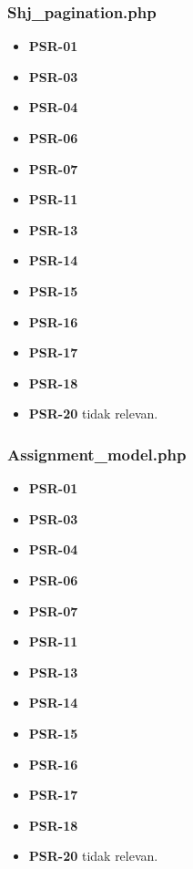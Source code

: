 \subsubsection{Shj\_pagination.php}
\begin{itemize}
	\item \textbf{PSR-01} 
	\item \textbf{PSR-03}
	\item \textbf{PSR-04}
	\item \textbf{PSR-06}
	\item \textbf{PSR-07}
	\item \textbf{PSR-11}
	\item \textbf{PSR-13}
	\item \textbf{PSR-14}
	\item \textbf{PSR-15}
	\item \textbf{PSR-16}
	\item \textbf{PSR-17} 
	\item \textbf{PSR-18} 
	\item \textbf{PSR-20} tidak relevan.
\end{itemize}

\subsubsection{Assignment\_model.php}
\begin{itemize}
	\item \textbf{PSR-01} 
	\item \textbf{PSR-03}
	\item \textbf{PSR-04}
	\item \textbf{PSR-06}
	\item \textbf{PSR-07}
	\item \textbf{PSR-11}
	\item \textbf{PSR-13}
	\item \textbf{PSR-14}
	\item \textbf{PSR-15}
	\item \textbf{PSR-16}
	\item \textbf{PSR-17} 
	\item \textbf{PSR-18} 
	\item \textbf{PSR-20} tidak relevan.
\end{itemize}

